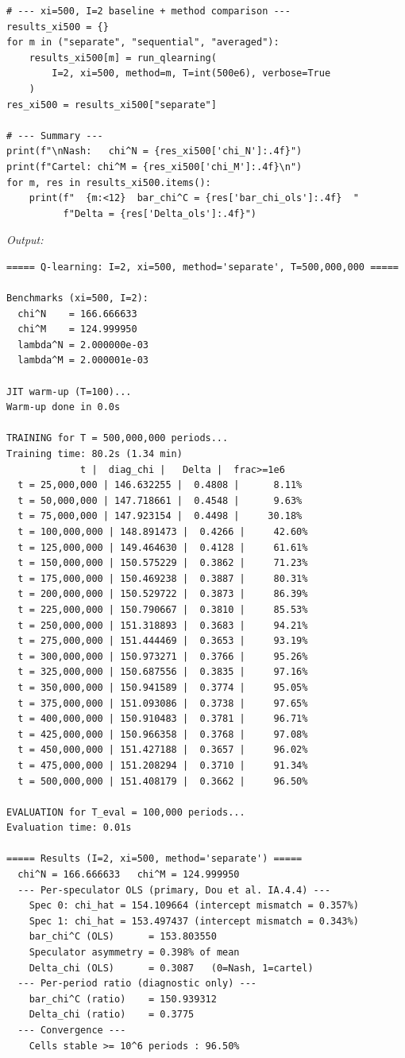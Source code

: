 \begin{lstlisting}[style=pythonstyle]
# --- xi=500, I=2 baseline + method comparison ---
results_xi500 = {}
for m in ("separate", "sequential", "averaged"):
    results_xi500[m] = run_qlearning(
        I=2, xi=500, method=m, T=int(500e6), verbose=True
    )
res_xi500 = results_xi500["separate"]

# --- Summary ---
print(f"\nNash:   chi^N = {res_xi500['chi_N']:.4f}")
print(f"Cartel: chi^M = {res_xi500['chi_M']:.4f}\n")
for m, res in results_xi500.items():
    print(f"  {m:<12}  bar_chi^C = {res['bar_chi_ols']:.4f}  "
          f"Delta = {res['Delta_ols']:.4f}")
\end{lstlisting}

\noindent\textit{Output:}
\begin{lstlisting}[style=outputstyle]
===== Q-learning: I=2, xi=500, method='separate', T=500,000,000 =====

Benchmarks (xi=500, I=2):
  chi^N    = 166.666633
  chi^M    = 124.999950
  lambda^N = 2.000000e-03
  lambda^M = 2.000001e-03

JIT warm-up (T=100)...
Warm-up done in 0.0s

TRAINING for T = 500,000,000 periods...
Training time: 80.2s (1.34 min)
             t |  diag_chi |   Delta |  frac>=1e6
  t = 25,000,000 | 146.632255 |  0.4808 |      8.11%
  t = 50,000,000 | 147.718661 |  0.4548 |      9.63%
  t = 75,000,000 | 147.923154 |  0.4498 |     30.18%
  t = 100,000,000 | 148.891473 |  0.4266 |     42.60%
  t = 125,000,000 | 149.464630 |  0.4128 |     61.61%
  t = 150,000,000 | 150.575229 |  0.3862 |     71.23%
  t = 175,000,000 | 150.469238 |  0.3887 |     80.31%
  t = 200,000,000 | 150.529722 |  0.3873 |     86.39%
  t = 225,000,000 | 150.790667 |  0.3810 |     85.53%
  t = 250,000,000 | 151.318893 |  0.3683 |     94.21%
  t = 275,000,000 | 151.444469 |  0.3653 |     93.19%
  t = 300,000,000 | 150.973271 |  0.3766 |     95.26%
  t = 325,000,000 | 150.687556 |  0.3835 |     97.16%
  t = 350,000,000 | 150.941589 |  0.3774 |     95.05%
  t = 375,000,000 | 151.093086 |  0.3738 |     97.65%
  t = 400,000,000 | 150.910483 |  0.3781 |     96.71%
  t = 425,000,000 | 150.966358 |  0.3768 |     97.08%
  t = 450,000,000 | 151.427188 |  0.3657 |     96.02%
  t = 475,000,000 | 151.208294 |  0.3710 |     91.34%
  t = 500,000,000 | 151.408179 |  0.3662 |     96.50%

EVALUATION for T_eval = 100,000 periods...
Evaluation time: 0.01s

===== Results (I=2, xi=500, method='separate') =====
  chi^N = 166.666633   chi^M = 124.999950
  --- Per-speculator OLS (primary, Dou et al. IA.4.4) ---
    Spec 0: chi_hat = 154.109664 (intercept mismatch = 0.357%)
    Spec 1: chi_hat = 153.497437 (intercept mismatch = 0.343%)
    bar_chi^C (OLS)      = 153.803550
    Speculator asymmetry = 0.398% of mean
    Delta_chi (OLS)      = 0.3087   (0=Nash, 1=cartel)
  --- Per-period ratio (diagnostic only) ---
    bar_chi^C (ratio)    = 150.939312
    Delta_chi (ratio)    = 0.3775
  --- Convergence ---
    Cells stable >= 10^6 periods : 96.50%


\end{lstlisting}
